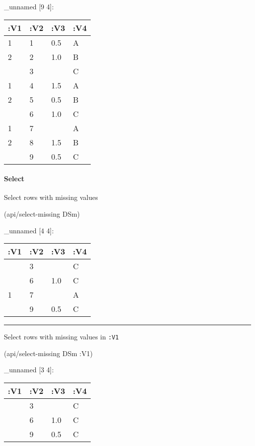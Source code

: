 \documentclass[]{article}
\newenvironment{Shaded}{\begin{snugshade}}{\end{snugshade}}
\newcommand{\AttributeTok}[1]{\textcolor[rgb]{0.77,0.63,0.00}{#1}}
\newcommand{\NormalTok}[1]{#1}
\let\oldparagraph\paragraph
\renewcommand{\paragraph}[1]{\oldparagraph{#1}\mbox{}}
\begin{document}
\_unnamed {[}9 4{]}:

\begin{longtable}[]{@{}llll@{}}
\toprule
:V1 & :V2 & :V3 & :V4\tabularnewline
\midrule
\endhead
1 & 1 & 0.5 & A\tabularnewline
2 & 2 & 1.0 & B\tabularnewline
& 3 & & C\tabularnewline
1 & 4 & 1.5 & A\tabularnewline
2 & 5 & 0.5 & B\tabularnewline
& 6 & 1.0 & C\tabularnewline
1 & 7 & & A\tabularnewline
2 & 8 & 1.5 & B\tabularnewline
& 9 & 0.5 & C\tabularnewline
\bottomrule
\end{longtable}

\hypertarget{select-2}{%
\paragraph{Select}\label{select-2}}

Select rows with missing values

\begin{Shaded}
\begin{Highlighting}[]
\NormalTok{(api/select-missing DSm)}
\end{Highlighting}
\end{Shaded}

\_unnamed {[}4 4{]}:

\begin{longtable}[]{@{}llll@{}}
\toprule
:V1 & :V2 & :V3 & :V4\tabularnewline
\midrule
\endhead
& 3 & & C\tabularnewline
& 6 & 1.0 & C\tabularnewline
1 & 7 & & A\tabularnewline
& 9 & 0.5 & C\tabularnewline
\bottomrule
\end{longtable}

\begin{center}\rule{0.5\linewidth}{0.5pt}\end{center}

Select rows with missing values in \texttt{:V1}

\begin{Shaded}
\begin{Highlighting}[]
\NormalTok{(api/select-missing DSm }\AttributeTok{:V1}\NormalTok{)}
\end{Highlighting}
\end{Shaded}

\_unnamed {[}3 4{]}:

\begin{longtable}[]{@{}llll@{}}
\toprule
:V1 & :V2 & :V3 & :V4\tabularnewline
\midrule
\endhead
& 3 & & C\tabularnewline
& 6 & 1.0 & C\tabularnewline
& 9 & 0.5 & C\tabularnewline
\bottomrule
\end{longtable}
\end{document}

